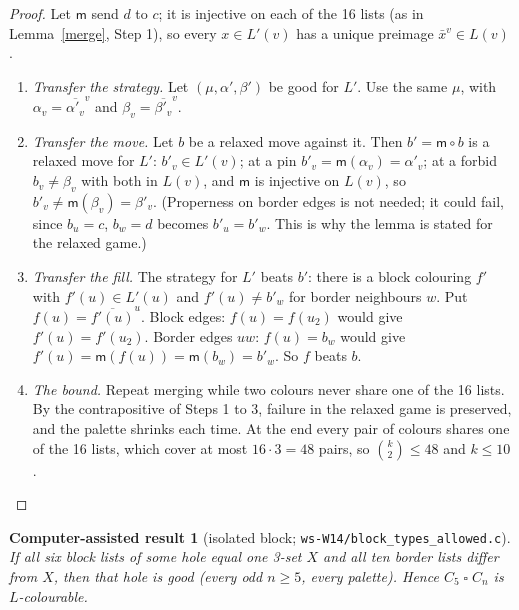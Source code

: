 \documentclass[11pt]{article}
\theoremstyle{plain}
\newtheorem{computed}[theorem]{Computer-assisted result}
\theoremstyle{definition}
\theoremstyle{remark}
\newcommand{\T}{\mathbin{\square}}
\newcommand{\script}[1]{\texttt{#1}}
\newenvironment{steps}[1][]{\begin{enumerate}[label=\textbf{Step \arabic*.},leftmargin=4.4em,itemsep=0.35em,#1]}{\end{enumerate}}
\begin{document}
\begin{proof}
Let $\mathsf{m}$ send $d$ to $c$; it is injective on each of the 16 lists (as in Lemma~\ref{merge}, Step 1), so every $x \in
L'(v)$ has a unique preimage $\bar{x}^v \in L(v)$.
\begin{steps}
\item \emph{Transfer the strategy.} Let $(\mu, \alpha', \beta')$ be good for $L'$. Use the same $\mu$, with
$\alpha_v = \overline{\alpha'_v}^v$ and $\beta_v = \overline{\beta'_v}^v$.
\item \emph{Transfer the move.} Let $b$ be a relaxed move against it. Then $b' = \mathsf{m} \circ b$ is a relaxed move for $L'$:
$b'_v \in L'(v)$; at a pin $b'_v = \mathsf{m}(\alpha_v) = \alpha'_v$; at a forbid $b_v \ne \beta_v$ with both in $L(v)$, and
$\mathsf{m}$ is injective on $L(v)$, so $b'_v \ne \mathsf{m}(\beta_v) = \beta'_v$. (Properness on border edges is not needed;
it could fail, since $b_u = c$, $b_w = d$ becomes $b'_u = b'_w$. This is why the lemma is stated for the relaxed game.)
\item \emph{Transfer the fill.} The strategy for $L'$ beats $b'$: there is a block colouring $f'$ with $f'(u) \in L'(u)$ and
$f'(u) \ne b'_w$ for border neighbours $w$. Put $f(u) = \overline{f'(u)}^u$. Block edges: $f(u) = f(u_2)$ would give
$f'(u) = f'(u_2)$. Border edges $uw$: $f(u) = b_w$ would give $f'(u) = \mathsf{m}(f(u)) = \mathsf{m}(b_w) = b'_w$. So $f$ beats $b$.
\item \emph{The bound.} Repeat merging while two colours never share one of the 16 lists. By the contrapositive of Steps 1
to 3, failure in the relaxed game is preserved, and the palette shrinks each time. At the end every pair of colours shares
one of the 16 lists, which cover at most $16 \cdot 3 = 48$ pairs, so $\binom{k}{2} \le 48$ and $k \le 10$. \qedhere
\end{steps}
\end{proof}

\begin{computed}[isolated block; \script{ws-W14/block\_types\_allowed.c}]\label{isoblock}
If all six block lists of some hole equal one 3-set $X$ and all ten border lists differ from $X$, then that hole is good
(every odd $n \ge 5$, every palette). Hence $C_5 \T C_n$ is $L$-colourable.
\end{computed}
\end{document}
